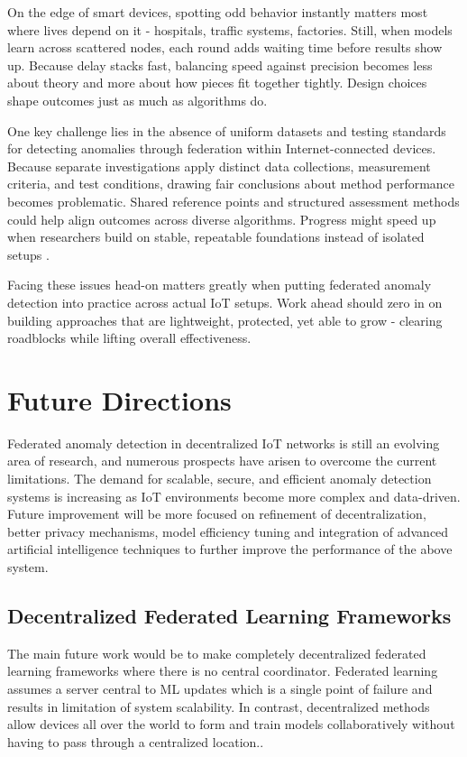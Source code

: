 \documentclass[12pt]{article}
\begin{document}
On the edge of smart devices, spotting odd behavior instantly matters most where lives depend on it - hospitals, traffic systems, factories. Still, when models learn across scattered nodes, each round adds waiting time before results show up. Because delay stacks fast, balancing speed against precision becomes less about theory and more about how pieces fit together tightly. Design choices shape outcomes just as much as algorithms do.

One key challenge lies in the absence of uniform datasets and testing standards for detecting anomalies through federation within Internet-connected devices. Because separate investigations apply distinct data collections, measurement criteria, and test conditions, drawing fair conclusions about method performance becomes problematic. Shared reference points and structured assessment methods could help align outcomes across diverse algorithms. Progress might speed up when researchers build on stable, repeatable foundations instead of isolated setups \cite{paper8,paper9}.

Facing these issues head-on matters greatly when putting federated anomaly detection into practice across actual IoT setups. Work ahead should zero in on building approaches that are lightweight, protected, yet able to grow - clearing roadblocks while lifting overall effectiveness.


	\section{Future Directions}
	
Federated anomaly detection in decentralized IoT networks is still an evolving area of research, and numerous prospects have arisen to overcome the current limitations. The demand for scalable, secure, and efficient anomaly detection systems is increasing as IoT environments become more complex and data-driven. Future improvement will be more focused on refinement of decentralization, better privacy mechanisms, model efficiency tuning and integration of advanced artificial intelligence techniques to further improve the performance of the above system.

\subsection{Decentralized Federated Learning Frameworks}

The main future work would be to make completely decentralized federated learning frameworks where there is no central coordinator. Federated learning assumes a server central to ML updates which is a single point of failure and results in limitation of system scalability. In contrast, decentralized methods allow devices all over the world to form and train models collaboratively without having to pass through a centralized location.\cite{paper1,paper2}.
\end{document}
